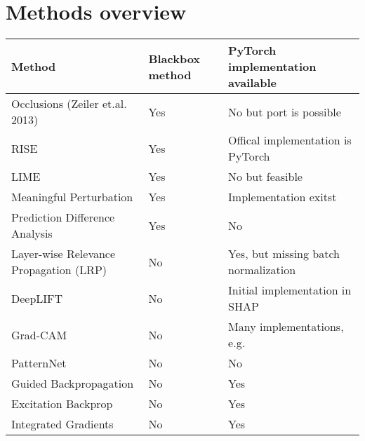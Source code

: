 \section{Methods overview}

\begin{tabular}{| p{7cm} | p{2.5cm} | p{6cm} | }
\hline
\textbf{Method} & \textbf{Blackbox method} & \textbf{PyTorch implementation available} \\ \hline
Occlusions (Zeiler et.al. 2013) \cite{zeiler2014visualizing} & Yes & No but port is possible \\ \hline
RISE \cite{Petsiuk2018rise} & Yes & Offical implementation is PyTorch \\ \hline
LIME \cite{ribeiro2016should} & Yes & No but feasible \\ \hline
Meaningful Perturbation \cite{fong2017interpretable} & Yes & Implementation exitst  \cite{fong2017implementation} \\ \hline
Prediction Difference Analysis \cite{zintgraf2017visualizing} & Yes & No \\ \hline
Layer-wise Relevance Propagation (LRP) \cite{bach2015pixel} & No & Yes, but missing batch normalization \cite{lrppytorch} \\ \hline
DeepLIFT \cite{shrikumar2017learning} & No & Initial implementation in SHAP \cite{NIPS2017_7062} \\ \hline
Grad-CAM \cite{selvaraju2017grad} & No & Many implementations, e.g. \cite{visualattribution} \\ \hline
PatternNet & No & No \\ \hline
Guided Backpropagation \cite{springenberg2014striving}  & No & Yes \cite{visualattribution} \\ \hline
Excitation Backprop \cite{zhang2016EB} & No & Yes \cite{visualattribution} \\ \hline
Integrated Gradients \cite{sundararajan2017axiomatic} & No & Yes \cite{integratedgradientpytorch}  \\ \hline
\end{tabular}

